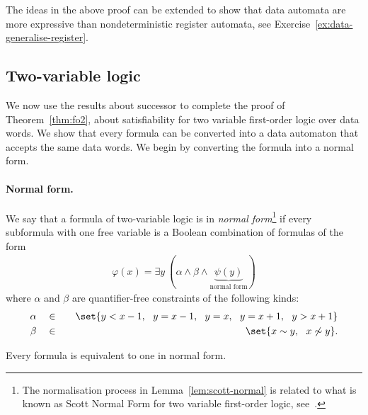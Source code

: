 The ideas in the above proof can be extended to show that data automata are more expressive than nondeterministic register automata, see Exercise~\ref{ex:data-generalise-register}.

\subsection*{Two-variable logic}
We now use the results about successor to complete the proof of Theorem~\ref{thm:fo2}, about satisfiability for two variable first-order logic over data words. We show that every formula can be converted into a data automaton that accepts the same data words. We begin by converting the formula into a normal form.

\paragraph*{Normal form.} We say that a formula of two-variable logic is in \emph{normal form}\footnote{The normalisation process in Lemma~\ref{lem:scott-normal} is related to what is known as Scott Normal Form for two variable first-order logic, see~\cite{scott_decision_1962}.} if every subformula with one free variable is a Boolean combination of formulas of the form
\begin{align*}
	\varphi(x) = \exists y\ (\alpha \land \beta \land 
	\underbrace{\psi(y)}_{\text{normal form}})
\end{align*}
where $\alpha$ and $\beta$ are quantifier-free constraints of the following kinds:
\begin{eqnarray}
	\label{eq:alpha-normalform}
	\alpha &\quad \in \quad& \set{y < x-1, \ \ y=x-1, \ \ y=x, \ \ y=x+1, \ \ y> x+1}\\
	\label{eq:beta-normalform}
	\beta & \quad \in \quad & \set{x \sim y, \ \ x \not \sim y}.
\end{eqnarray}
\begin{lemma}\label{lem:scott-normal}
	Every formula is equivalent to one in normal form.
\end{lemma}
